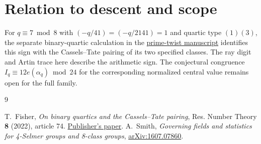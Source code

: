 \documentclass[11pt]{article}
\begin{document}
\section{Relation to descent and scope}

For $q\equiv7\bmod 8$ with $(-q/41)=(-q/2141)=1$ and quartic type
$(1)(3)$, the separate binary-quartic calculation in the
\href{https://github.com/cosmosgeek0/BSD/blob/main/fisher-twist-rank-zero.pdf}{prime-twist manuscript}
identifies this sign with the Cassels--Tate pairing of its two
specified classes. The ray digit and Artin trace here describe the
arithmetic sign. The conjectural congruence
$I_q\equiv12e(\alpha_q)\bmod24$ for the corresponding normalized
central value remains open for the full family.

\begin{thebibliography}{9}
\raggedright
{} T.~Fisher, \emph{On binary quartics and the Cassels--Tate pairing},
Res. Number Theory \textbf{8} (2022), article 74.
\href{https://doi.org/10.1007/s40993-022-00376-z}{Publisher's paper}.
 A.~Smith, \emph{Governing fields and statistics for
4-Selmer groups and 8-class groups},
\href{https://arxiv.org/abs/1607.07860}{arXiv:1607.07860}.
\end{thebibliography}
\end{document}
